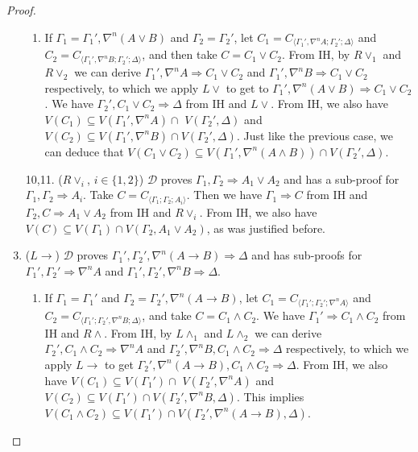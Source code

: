 \documentclass[12pt,a4paper]{article}
\theoremstyle{plain}
\theoremstyle{definition}
\begin{document}
\begin{proof}
\begin{enumerate}
\begin{enumerate}
		\item If $\Gamma_1 = \Gamma_1' , \nabla^n (A \lor B)$ and $\Gamma_2 = \Gamma_2'$, let $C_1 = C_{\langle\Gamma_1',\nabla^n A;\Gamma_2';\Delta\rangle}$ and $C_2 = C_{\langle\Gamma_1',\nabla^n B;\Gamma_2';\Delta\rangle}$, and then take $C = C_1 \lor C_2$.
		From IH, by $R\lor_1$ and $R\lor_2$ we can derive $\Gamma_1' , \nabla^n A \Rightarrow C_1 \lor C_2$ and $\Gamma_1' , \nabla^n B \Rightarrow C_1 \lor C_2$ respectively, to which we apply $L\lor$ to get to $\Gamma_1' , \nabla^n (A \lor B) \Rightarrow C_1 \lor C_2$.
		We have $\Gamma_2' , C_1 \lor C_2 \Rightarrow \Delta$ from IH and $L\lor$.
		From IH, we also have $V(C_1) \subseteq V(\Gamma_1' , \nabla^n A) \cap$ $V(\Gamma_2' , \Delta)$ and $V(C_2) \subseteq V(\Gamma_1' , \nabla^n B) \cap V(\Gamma_2' , \Delta)$. Just like the previous case, we can deduce that $V(C_1 \lor C_2) \subseteq V(\Gamma_1' , \nabla^n (A \land B)) \cap V(\Gamma_2' , \Delta)$.
	\end{enumerate}

	\item[10,11.] ($R\lor_i$, {\small$i \in \{1,2\}$}) $\mathcal{D}$ proves $\Gamma_1 , \Gamma_2 \Rightarrow A_1 \lor A_2$ and has a sub-proof for $\Gamma_1 , \Gamma_2 \Rightarrow A_i$. Take $C = C_{\langle\Gamma_1;\Gamma_2;A_i\rangle}$. Then we have $\Gamma_1 \Rightarrow C$ from IH and $\Gamma_2 , C \Rightarrow A_1 \lor A_2$ from IH and $R\lor_i$.
	From IH, we also have $V(C) \subseteq V(\Gamma_1) \cap V(\Gamma_2 , A_1 \lor A_2)$, as was justified before.
	\setcounter{enumi}{11}
	
	\item ($L\rightarrow$) $\mathcal{D}$ proves $\Gamma_1' , \Gamma_2' , \nabla^n (A \rightarrow B) \Rightarrow \Delta$ and has sub-proofs for $\Gamma_1' , \Gamma_2' \Rightarrow \nabla^n A$ and $\Gamma_1' , \Gamma_2' , \nabla^n B \Rightarrow \Delta$.
	\begin{enumerate}
		\item If $\Gamma_1 = \Gamma_1'$ and $\Gamma_2 = \Gamma_2' , \nabla^n (A \rightarrow B)$, let $C_1 = C_{\langle\Gamma_1';\Gamma_2';\nabla^n A\rangle}$ and $C_2 = C_{\langle\Gamma_1';\Gamma_2',\nabla^n B;\Delta\rangle}$, and take $C = C_1 \land C_2$.
		We have $\Gamma_1' \Rightarrow C_1 \land C_2$ from IH and $R\land$.
		From IH, by $L\land_1$ and $L\land_2$ we can derive $\Gamma_2' , C_1 \land C_2 \Rightarrow \nabla^n A$ and $\Gamma_2' , \nabla^n B , C_1 \land C_2 \Rightarrow \Delta$ respectively, to which we apply $L\rightarrow$ to get $\Gamma_2' , \nabla^n (A \rightarrow B) , C_1 \land C_2 \Rightarrow \Delta$.
		From IH, we also have $V(C_1) \subseteq V(\Gamma_1') \cap$ $V(\Gamma_2' , \nabla^n A)$ and $V(C_2) \subseteq V(\Gamma_1') \cap V(\Gamma_2' , \nabla^n B , \Delta)$. This implies $V(C_1 \land C_2) \subseteq V(\Gamma_1') \cap V(\Gamma_2' , \nabla^n (A \rightarrow B) , \Delta)$.


\end{enumerate}
\end{enumerate}
\end{proof}
\end{document}

